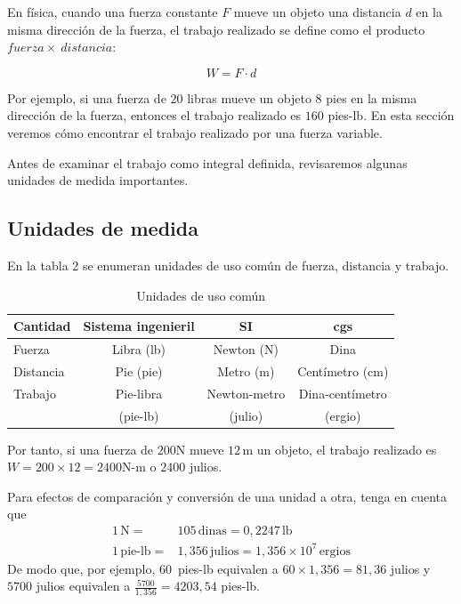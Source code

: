 En física, cuando una fuerza constante $F$ mueve un objeto una distancia $d$ en la misma dirección de la fuerza, el trabajo realizado se define como el producto $fuerza \times \ distancia$:

\[
W=F\cdot d
\]

Por ejemplo, si una fuerza de $20$ libras mueve un objeto $8$ pies en la misma
dirección de la fuerza, entonces el trabajo realizado es $160$ pies-lb. En
esta sección veremos cómo encontrar el trabajo realizado por una
fuerza variable.

Antes de examinar el trabajo como integral definida, revisaremos algunas
unidades de medida importantes.

\subsection*{Unidades de medida}
En la tabla 2 se enumeran unidades de uso común de fuerza, distancia y trabajo.
\begin{table}[H]
\caption{Unidades de uso común}
\begin{tabular}{|l|c|c|c|}
	\hline
	\textbf{Cantidad} & \textbf{Sistema ingenieril} & \textbf{SI} & \textbf{cgs} \\ \hline
	Fuerza & Libra (lb) & Newton (N) & Dina \\ \hline
	Distancia & Pie (pie) & Metro (m) & Centímetro (cm) \\ \hline
	Trabajo & Pie-libra & Newton-metro & Dina-centímetro
	\\
 & (pie-lb) & (julio) & (ergio) \\ \hline
\end{tabular}

\propia
\end{table}



Por tanto, si una fuerza de $200$N mueve $12$\,m un objeto, el trabajo realizado
es $W=200\times12=2400$N-m o $2400$ julios.

Para efectos de comparación y conversión de una unidad a otra, tenga en cuenta que
\begin{align*}
 1\,\text{N}=& 105\, \text{dinas}=0,2247\, \text{lb} \\
 1\,\text{pie-lb} =& 1,356\, \text{julios} =1,356\times 10^{7}\, \text{ergios}
\end{align*}
De modo que, por ejemplo, $60\,$ pies-lb equivalen a $60\times 1,356=81,36$ julios y $5700$ julios equivalen a $\frac{5700}{1,356}=4203,54$ pies-lb.

